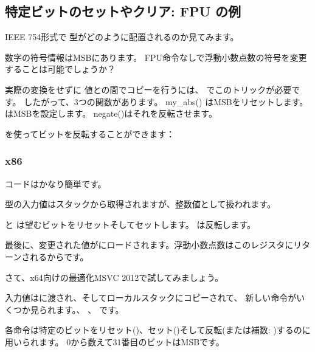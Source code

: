 ﻿\subsection{特定ビットのセットやクリア: \ac{FPU} の例}


IEEE 754形式で \Tfloat 型がどのように配置されるのか見てみます。



数字の符号情報は\ac{MSB}にあります。
FPU命令なしで浮動小数点数の符号を変更することは可能でしょうか？



実際の変換をせずに \Tfloat 値との間でコピーを行うには、 \CCpp でこのトリックが必要です。 
したがって、3つの関数があります。 my\_abs() は\ac{MSB}をリセットします。 は\ac{MSB}を設定します。 negate()はそれを反転させます。

\XOR を使ってビットを反転することができます：

\subsubsection{x86}

コードはかなり簡単です。



\Tfloat 型の入力値はスタックから取得されますが、整数値として扱われます。

\AND と \OR は望むビットをリセットそしてセットします。
\XOR は反転します。

最後に、変更された値がにロードされます。浮動小数点数はこのレジスタにリターンされるからです。

さて、x64向けの最適化MSVC 2012で試してみましょう。




入力値はに渡され、そしてローカルスタックにコピーされて、
新しい命令がいくつか見られます。\BTR 、 \BTS 、 \BTC です。

各命令は特定のビットをリセット(\BTR)、セット(\BTS)そして反転(または補数: \BTC)するのに用いられます。
0から数えて31番目のビットは\ac{MSB}です。

